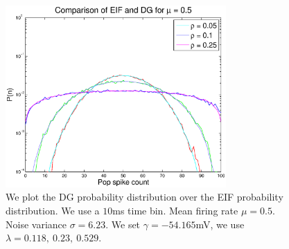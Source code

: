 \documentclass[11pt]{article}
\begin{document}
\begin{figure}[H]
\centering
\includegraphics[width=0.75\textwidth]{../Figures/EIF/DG_EIF_Macke_2a_mu_05_semilog}
\caption{\footnotesize We plot the DG probability distribution over the EIF probability distribution. We use a $10$ms time bin. Mean firing rate $\mu = 0.5$. Noise variance $\sigma = 6.23$. We set $\gamma = -54.165$mV, we use $\lambda = 0.118,~0.23,~0.529$.}
\label{figdgeif}
\end{figure}

\newpage
\end{document}
